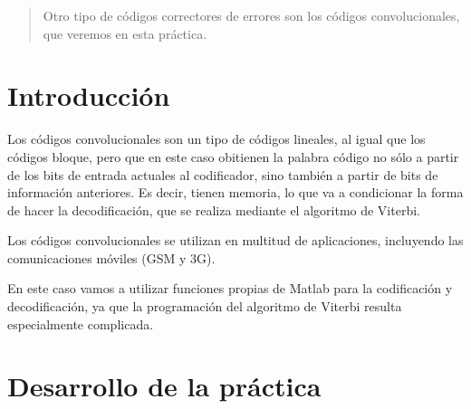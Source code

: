 \documentclass[es,practica]{uah}
\begin{document}

\maketitle

\begin{abstract}
	Otro tipo de códigos correctores de errores son los códigos convolucionales, que veremos en esta práctica.
\end{abstract}

\section{Introducción}

Los códigos convolucionales son un tipo de códigos lineales, al igual que los códigos bloque, pero que en este caso obitienen la palabra código no sólo a partir de los bits de entrada actuales al codificador, sino también a partir de bits de información anteriores. Es decir, tienen memoria, lo que va a condicionar la forma de hacer la decodificación, que se realiza mediante el algoritmo de Viterbi. 

Los códigos convolucionales se utilizan en multitud de aplicaciones, incluyendo las comunicaciones móviles (GSM y 3G). 

En este caso vamos a utilizar funciones propias de Matlab para la codificación y decodificación, ya que la programación del algoritmo de Viterbi resulta especialmente complicada. 

\section{Desarrollo de la práctica}
\end{document}
